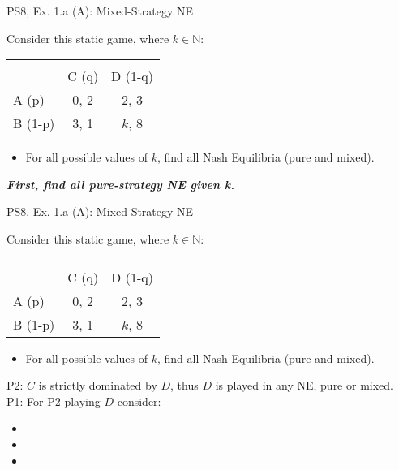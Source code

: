 \begin{frame}{PS8, Ex. 1.a (A): Mixed-Strategy NE}
    \begin{multicols}{2}
      Consider this static game, where $k\in\mathbb{N}:$
      \vspace{-16pt}
      \begin{table}
        \begin{tabular}{l|c|c|}
          \multicolumn{1}{c}{} & \multicolumn{2}{c}{} \\
          \multicolumn{1}{c}{} & \multicolumn{1}{c}{C (q)} & \multicolumn{1}{c}{D (1-q)} \\\cline{2-3}
          A (p)   & 0, 2 & 2, 3 \\\cline{2-3}
          B (1-p) & 3, 1 & $k$, 8 \\\cline{2-3}
        \end{tabular}
      \end{table}
      \begin{itemize}
        \item[(a)] For all possible values of $k$, find all Nash Equilibria (pure and mixed).
      \end{itemize}
      \textbf{\textit{First, find all pure-strategy NE given k.}}
      \vfill\null\columnbreak
      \vfill\null
    \end{multicols}
\end{frame}
\begin{frame}{PS8, Ex. 1.a (A): Mixed-Strategy NE}
    \begin{multicols}{2}
      Consider this static game, where $k\in\mathbb{N}:$
      \vspace{-16pt}
      \begin{table}
        \begin{tabular}{l|c|c|}
          \multicolumn{1}{c}{} & \multicolumn{2}{c}{} \\
          \multicolumn{1}{c}{} & \multicolumn{1}{c}{C (q)} & \multicolumn{1}{c}{\color{blue}D (1-q)} \\\cline{2-3}
          A (p)   & 0, 2 & 2, \color{blue}3 \\\cline{2-3}
          B (1-p) & 3, 1 & $k$, \color{blue}8 \\\cline{2-3}
        \end{tabular}
      \end{table}
      \begin{itemize}
        \item[(a)] For all possible values of $k$, find all Nash Equilibria (pure and mixed).
      \end{itemize}
      P2: $C$ is strictly dominated by $D$, thus $D$ is played in any NE, pure or mixed.\\\medskip
      P1: For P2 playing $D$ consider:
      \begin{itemize}
        \item[$k=$1:]
        \item[$k=$2:]
        \item[$k\geq$3:]
      \end{itemize}
      \vfill\null\columnbreak
      \vfill\null
    \end{multicols}
\end{frame}
